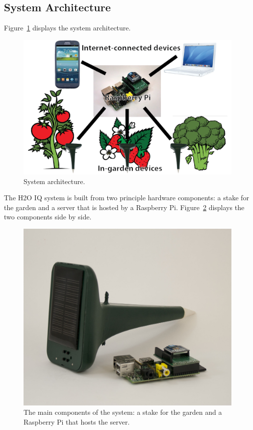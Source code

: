 \documentclass[11pt]{article}
\begin{document}
\subsection{System Architecture}

Figure~\ref{fig:architecture} displays the system architecture.

\begin{figure}[h]
\begin{center}
\includegraphics[scale=0.7]{./pngs/architecture.png}
\end{center}
\caption{System architecture.}
\label{fig:architecture}
\end{figure}

The H2O IQ system is built from two principle hardware components: a stake for the garden and a server that is hosted by a Raspberry Pi. Figure~\ref{fig:device} displays the two components side by side.

\begin{figure}[h]
\begin{center}
\includegraphics[scale=0.15]{./pngs/device.jpg}
\end{center}
\caption{The main components of the system: a stake for the garden and a Raspberry Pi that hosts the server.}
\label{fig:device}
\end{figure}
\end{document}
